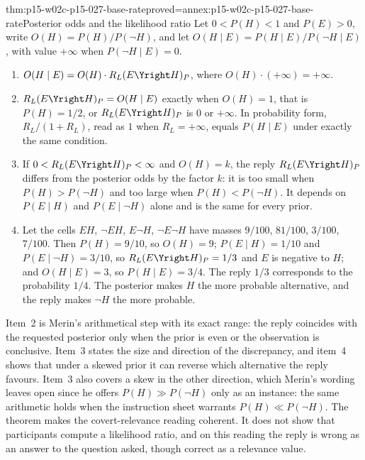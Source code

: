 \begin{hbtheorem}{thm:p15-w02c-p15-027-base-rate}{proved=annex:p15-w02c-p15-027-base-rate}{Posterior odds and the likelihood ratio}
Let \(0<P(H)<1\) and \(P(E)>0\), write \(O(H)=P(H)/P(\neg H)\), and let
\(O(H\mid E)=P(H\mid E)/P(\neg H\mid E)\), with value \(+\infty\) when
\(P(\neg H\mid E)=0\).
\begin{enumerate}
\item \(O(H\mid E)=O(H)\cdot R_L(E\Yright H)_P\), where
  \(O(H)\cdot(+\infty)=+\infty\).
\item \(R_L(E\Yright H)_P=O(H\mid E)\) exactly when \(O(H)=1\), that is
  \(P(H)=1/2\), or \(R_L(E\Yright H)_P\) is \(0\) or \(+\infty\). In
  probability form, \(R_L/(1+R_L)\), read as \(1\) when \(R_L=+\infty\),
  equals \(P(H\mid E)\) under exactly the same condition.
\item If \(0<R_L(E\Yright H)_P<\infty\) and \(O(H)=k\), the reply
  \(R_L(E\Yright H)_P\) differs from the posterior odds by the factor
  \(k\): it is too small when \(P(H)>P(\neg H)\) and too large when
  \(P(H)<P(\neg H)\). It depends on \(P(E\mid H)\) and \(P(E\mid\neg H)\)
  alone and is the same for every prior.
\item Let the cells \(EH\), \(\neg EH\), \(E\neg H\), \(\neg E\neg H\) have
  masses \(9/100\), \(81/100\), \(3/100\), \(7/100\). Then
  \(P(H)=9/10\), so \(O(H)=9\); \(P(E\mid H)=1/10\) and
  \(P(E\mid\neg H)=3/10\), so \(R_L(E\Yright H)_P=1/3\) and \(E\) is
  negative to \(H\); and \(O(H\mid E)=3\), so \(P(H\mid E)=3/4\). The
  reply \(1/3\) corresponds to the probability \(1/4\). The posterior
  makes \(H\) the more probable alternative, and the reply makes
  \(\neg H\) the more probable.
\end{enumerate}
\end{hbtheorem}

Item~2 is Merin's arithmetical step with its exact range: the reply
coincides with the requested posterior only when the prior is even or
the observation is conclusive. Item~3 states the size and direction of
the discrepancy, and item~4 shows that under a skewed prior it can
reverse which alternative the reply favours. Item~3 also covers a skew
in the other direction, which Merin's wording leaves open since he
offers \(P(H)\gg P(\neg H)\) only as an instance: the same arithmetic
holds when the instruction sheet warrants \(P(H)\ll P(\neg H)\). The theorem makes the covert-relevance reading
coherent. It does not show that participants compute a likelihood
ratio, and on this reading the reply is wrong as an answer to the
question asked, though correct as a relevance value.

